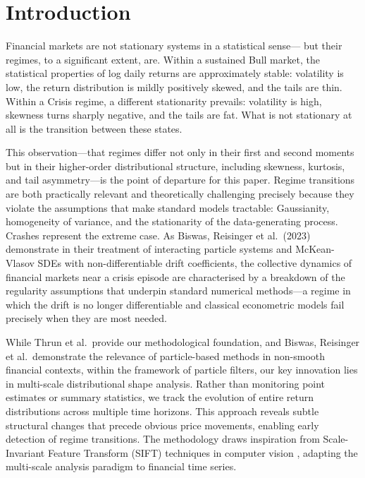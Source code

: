 \documentclass[11pt]{article}
\begin{document}
\section{Introduction}

Financial markets are not stationary systems in a statistical sense---
but their regimes, to a significant extent, are. Within a sustained Bull
market, the statistical properties of log daily returns are
approximately stable: volatility is low, the return distribution is
mildly positively skewed, and the tails are thin. Within a Crisis
regime, a different stationarity prevails: volatility is high, skewness
turns sharply negative, and the tails are fat. What is not stationary at
all is the transition between these states.

This observation---that regimes differ not only in their first and
second moments but in their higher-order distributional structure,
including skewness, kurtosis, and tail asymmetry---is the point of
departure for this paper. Regime transitions are both practically
relevant and theoretically challenging precisely because they violate
the assumptions that make standard models tractable: Gaussianity,
homogeneity of variance, and the stationarity of the data-generating
process. Crashes represent the extreme case. As Biswas, Reisinger et
al.\ (2023) demonstrate in their treatment of interacting particle
systems and McKean-Vlasov SDEs with non-differentiable drift
coefficients, the collective dynamics of financial markets near a crisis
episode are characterised by a breakdown of the regularity assumptions
that underpin standard numerical methods---a regime in which the drift
is no longer differentiable and classical econometric models fail
precisely when they are most needed.

While Thrun et al.\ provide our methodological foundation, and Biswas,
Reisinger et al.\ demonstrate the relevance of particle-based methods in
non-smooth financial contexts, within the framework of particle filters,
our key innovation lies in multi-scale distributional shape analysis.
Rather than monitoring point estimates or summary statistics, we track
the evolution of entire return distributions across multiple time
horizons. This approach reveals subtle structural changes that precede
obvious price movements, enabling early detection of regime transitions.
The methodology draws inspiration from Scale-Invariant Feature Transform
(SIFT) techniques in computer vision \citep{Lowe2004}, adapting the
multi-scale analysis paradigm to financial time series.
\end{document}

